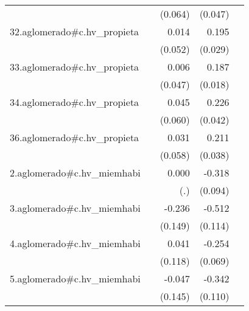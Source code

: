 {\begin{longtable}{l*{4}{D{.}{.}{-1}}}
            &                     &     (0.064)         &     (0.047)         &                     \\
\addlinespace
32.aglomerado#c.hv\_propieta&                     &       0.014         &       0.195\sym{***}&                     \\
            &                     &     (0.052)         &     (0.029)         &                     \\
\addlinespace
33.aglomerado#c.hv\_propieta&                     &       0.006         &       0.187\sym{***}&                     \\
            &                     &     (0.047)         &     (0.018)         &                     \\
\addlinespace
34.aglomerado#c.hv\_propieta&                     &       0.045         &       0.226\sym{***}&                     \\
            &                     &     (0.060)         &     (0.042)         &                     \\
\addlinespace
36.aglomerado#c.hv\_propieta&                     &       0.031         &       0.211\sym{***}&                     \\
            &                     &     (0.058)         &     (0.038)         &                     \\
\addlinespace
2.aglomerado#c.hv\_miemhabi&                     &       0.000         &      -0.318\sym{***}&                     \\
            &                     &         (.)         &     (0.094)         &                     \\
\addlinespace
3.aglomerado#c.hv\_miemhabi&                     &      -0.236         &      -0.512\sym{***}&                     \\
            &                     &     (0.149)         &     (0.114)         &                     \\
\addlinespace
4.aglomerado#c.hv\_miemhabi&                     &       0.041         &      -0.254\sym{***}&                     \\
            &                     &     (0.118)         &     (0.069)         &                     \\
\addlinespace
5.aglomerado#c.hv\_miemhabi&                     &      -0.047         &      -0.342\sym{**} &                     \\
            &                     &     (0.145)         &     (0.110)         &                     \\

\end{longtable}}
